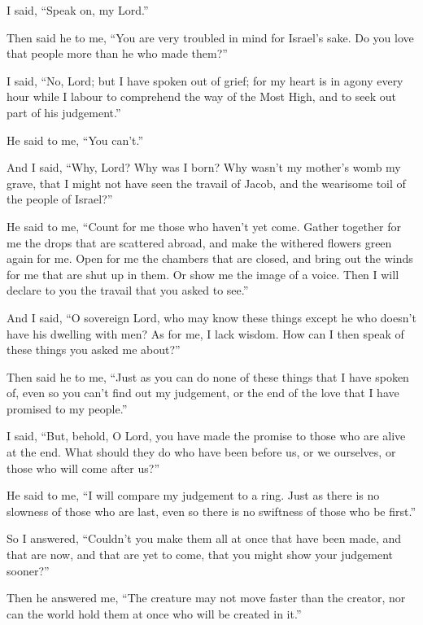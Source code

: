 I said, ``Speak on, my Lord.''

Then said he to me, ``You are very troubled in mind for Israel's sake.
Do you love that people more than he who made them?''

 I said, ``No, Lord; but I have spoken out of grief; for my
heart is in agony every hour while I labour to comprehend the way of the
Most High, and to seek out part of his judgement.''

 He said to me, ``You can't.''

And I said, ``Why, Lord? Why was I born? Why wasn't my mother's womb my
grave, that I might not have seen the travail of Jacob, and the
wearisome toil of the people of Israel?''

 He said to me, ``Count for me those who haven't yet come.
Gather together for me the drops that are scattered abroad, and make the
withered flowers green again for me.  Open for me the
chambers that are closed, and bring out the winds for me that are shut
up in them. Or show me the image of a voice. Then I will declare to you
the travail that you asked to see.''

 And I said, ``O sovereign Lord, who may know these things
except he who doesn't have his dwelling with men?  As for
me, I lack wisdom. How can I then speak of these things you asked me
about?''

 Then said he to me, ``Just as you can do none of these
things that I have spoken of, even so you can't find out my judgement,
or the end of the love that I have promised to my people.''

 I said, ``But, behold, O Lord, you have made the promise
to those who are alive at the end. What should they do who have been
before us, or we ourselves, or those who will come after us?''

 He said to me, ``I will compare my judgement to a ring.
Just as there is no slowness of those who are last, even so there is no
swiftness of those who be first.''

 So I answered, ``Couldn't you make them all at once that
have been made, and that are now, and that are yet to come, that you
might show your judgement sooner?''

 Then he answered me, ``The creature may not move faster
than the creator, nor can the world hold them at once who will be
created in it.''

